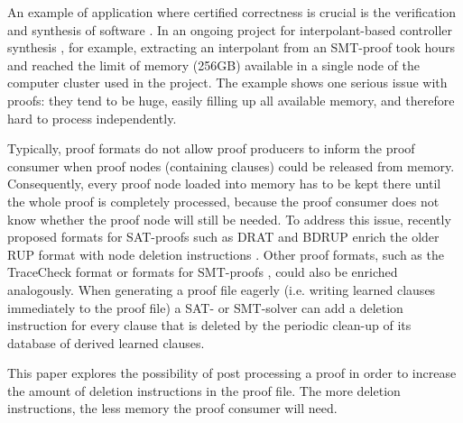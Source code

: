 An example of application where certified correctness is crucial is the verification and synthesis of software \cite{Biere2009,Hofferek2013}. 
In an ongoing project for interpolant-based controller synthesis \cite{Hofferek2013}, 
for example, extracting an interpolant from an SMT-proof took hours and reached the limit of memory (256GB) available in a single node of the computer cluster used in the project. 
The example shows one serious issue with proofs: they tend to be huge, easily filling up all available memory, and therefore hard to process independently.

Typically, proof formats do not allow proof producers to inform the proof consumer when proof nodes (containing clauses) could be released from memory. Consequently, every proof node loaded into memory has to be kept there until the whole proof is completely processed, because the proof consumer does not know whether the proof node will still be needed. To address this issue, recently proposed formats for SAT-proofs such as DRAT and BDRUP enrich the older RUP format with node deletion instructions \cite{raey}. Other proof formats, such as the TraceCheck format \cite{BiereHeuleAPPA} or formats for SMT-proofs \cite{BarrettFontaineMouraAPPA}, could also be enriched analogously. When generating a proof file eagerly (i.e. writing learned clauses immediately to the proof file) a SAT- or SMT-solver can add a deletion instruction for every clause that is deleted by the periodic clean-up of its database of derived learned clauses.

This paper explores the possibility of post processing a proof in order to increase the amount of deletion instructions in the proof file. 
The more deletion instructions, the less memory the proof consumer will need.


